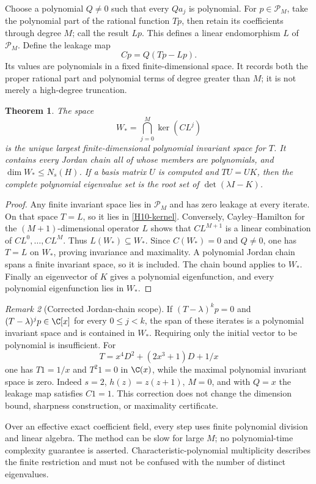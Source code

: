 \documentclass[11pt,a4paper]{article}
\newtheorem{theorem}{Theorem}[section]
\theoremstyle{definition}\newtheorem{definition}[theorem]{Definition}
\theoremstyle{remark}\newtheorem{remark}[theorem]{Remark}
\newcommand{\Pcal}{\mathcal P}\newcommand{\PP}{\mathcal P}\newcommand{\Pp}{\mathcal P}
\numberwithin{equation}{section}
\begin{document}
Choose a polynomial $Q\ne0$ such that every $Qa_j$ is polynomial. For $p\in\Pcal_M$, take the polynomial part of the rational function $Tp$, then retain its coefficients through degree $M$; call the result $Lp$. This defines a linear endomorphism $L$ of $\Pcal_M$. Define the leakage map
\[Cp=Q(Tp-Lp).
\]
Its values are polynomials in a fixed finite-dimensional space. It records both the proper rational part and polynomial terms of degree greater than $M$; it is not merely a high-degree truncation.
\begin{theorem}\label{H10-algorithm}
The space
\begin{equation}\label{H10-kernel}
W_* =\bigcap_{j=0}^{M}\ker(CL^j)
\end{equation}
is the unique largest finite-dimensional polynomial invariant space for $T$. It contains every Jordan chain all of whose members are polynomials, and $\dim W_*\le N_s(H)$. If a basis matrix $U$ is computed and $TU=UK$, then the complete polynomial eigenvalue set is the root set of $\det(\lambda I-K)$.
\end{theorem}
\begin{proof}
Any finite invariant space lies in $\Pcal_M$ and has zero leakage at every iterate. On that space $T=L$, so it lies in \eqref{H10-kernel}. Conversely, Cayley--Hamilton for the $(M+1)$-dimensional operator $L$ shows that $CL^{M+1}$ is a linear combination of $CL^0,\ldots,CL^M$. Thus $L(W_*)\subseteq W_*$. Since $C(W_*)=0$ and $Q\ne0$, one has $T=L$ on $W_*$, proving invariance and maximality. A polynomial Jordan chain spans a finite invariant space, so it is included. The chain bound applies to $W_*$. Finally an eigenvector of $K$ gives a polynomial eigenfunction, and every polynomial eigenfunction lies in $W_*$.
\end{proof}
\begin{remark}[Corrected Jordan-chain scope]
If $(T-\lambda)^k p=0$ and $(T-\lambda)^j p\in\C[x]$ for every $0\le j<k$, the span of these iterates is a polynomial invariant space and is contained in $W_*$. Requiring only the initial vector to be polynomial is insufficient. For
\[
T=x^4D^2+(2x^3+1)D+1/x
\]
one has $T1=1/x$ and $T^2 1=0$ in $\C(x)$, while the maximal polynomial invariant space is zero. Indeed $s=2$, $h(z)=z(z+1)$, $M=0$, and with $Q=x$ the leakage map satisfies $C1=1$. This correction does not change the dimension bound, sharpness construction, or maximality certificate.
\end{remark}

Over an effective exact coefficient field, every step uses finite polynomial division and linear algebra. The method can be slow for large $M$; no polynomial-time complexity guarantee is asserted. Characteristic-polynomial multiplicity describes the finite restriction and must not be confused with the number of distinct eigenvalues.
\end{document}
